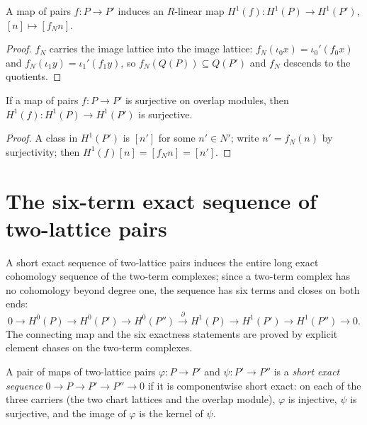 \begin{definition}
  \label{pa-def:twoLattice_h1Map}
  \leanok

  A map of pairs \(f : P \to P'\) induces an \(R\)-linear map
  \(H^1(f) : H^1(P) \to H^1(P')\), \([n] \mapsto [f_N n]\).
\end{definition}
\begin{proof}
  \leanok
  \(f_N\) carries the image lattice into the image lattice:
  \(f_N(\iota_0 x) = \iota_0'(f_0 x)\) and \(f_N(\iota_1 y) = \iota_1'(f_1 y)\), so
  \(f_N(Q(P)) \subseteq Q(P')\) and \(f_N\) descends to the quotients.
\end{proof}

\begin{lemma}
  \label{pa-lem:twoLattice_h1Map_surjective}
  \leanok

  If a map of pairs \(f : P \to P'\) is surjective on overlap modules, then
  \(H^1(f) : H^1(P) \to H^1(P')\) is surjective.
\end{lemma}
\begin{proof}
  \leanok
  A class in \(H^1(P')\) is \([n']\) for some \(n' \in N'\); write \(n' = f_N(n)\) by
  surjectivity; then \(H^1(f)[n] = [f_N n] = [n']\).
\end{proof}

\section{The six-term exact sequence of two-lattice pairs}
\label{pa-sec:two_lattice_sixterm}

A short exact sequence of two-lattice pairs induces the entire long exact cohomology
sequence of the two-term complexes; since a two-term complex has no cohomology beyond
degree one, the sequence has six terms and closes on both ends:
\[
  0 \to H^0(P) \to H^0(P') \to H^0(P'')
    \xrightarrow{\ \partial\ } H^1(P) \to H^1(P') \to H^1(P'') \to 0 .
\]
The connecting map and the six exactness statements are proved by explicit element
chases on the two-term complexes.

\begin{definition}
  \label{pa-def:twoLattice_shortExact}
  \leanok

  A pair of maps of two-lattice pairs \(\varphi : P \to P'\) and \(\psi : P' \to P''\)
  is a \emph{short exact sequence} \(0 \to P \to P' \to P'' \to 0\) if it is
  componentwise short exact: on each of the three carriers (the two chart lattices and
  the overlap module), \(\varphi\) is injective, \(\psi\) is surjective, and the image
  of \(\varphi\) is the kernel of \(\psi\).
\end{definition}

